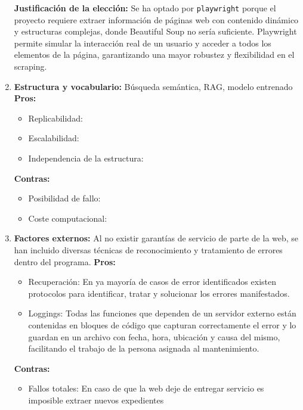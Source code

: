 \documentclass{article}
\begin{document}
\begin{enumerate}
    \textbf{Justificación de la elección:} \newline
    Se ha optado por \texttt{playwright} porque el proyecto requiere extraer información de páginas web con contenido dinámico y estructuras complejas, donde Beautiful Soup no sería suficiente. Playwright permite simular la interacción real de un usuario y acceder a todos los elementos de la página, garantizando una mayor robustez y flexibilidad en el scraping.


    
    \item  \textbf{Estructura y vocabulario:}
    Búsqueda semántica, RAG, modelo entrenado
    \textbf{Pros:} 
    \begin{itemize}
    \item Replicabilidad: 
    \item Escalabilidad: 
    \item Independencia de la estructura: 
    \end{itemize}
    \textbf{Contras:} 
    \begin{itemize}
    \item Posibilidad de fallo:
    \item Coste computacional: 
    \end{itemize}
    
    \item  \textbf{Factores externos:} \newline{}
    Al no existir garantías de servicio de parte de la web, se han incluido diversas técnicas de reconocimiento y tratamiento de errores dentro del programa.
    \newline{}
    \textbf{Pros:} 
    \begin{itemize}
    \item Recuperación: En ya mayoría de casos de error identificados existen protocolos para identificar, tratar y solucionar los errores manifestados.    \item Loggings: Todas las funciones que dependen de un servidor externo están contenidas en bloques de código que capturan correctamente el error y lo guardan en un archivo con fecha, hora, ubicación y causa del mismo, facilitando el trabajo de la persona asignada al mantenimiento.
    \end{itemize}
    \textbf{Contras:} 
    \begin{itemize}
    \item Fallos totales: En caso de que la web deje de entregar servicio es imposible extraer nuevos expedientes
    \end{itemize}
    

\end{enumerate}
\end{document}
